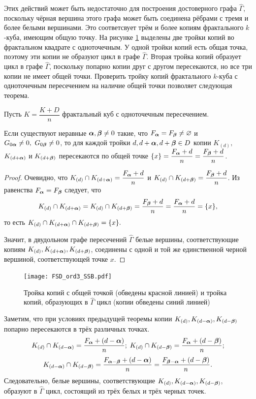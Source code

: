 Этих действий может быть недостаточно для построения достоверного графа $\hat\Gamma$, поскольку чёрная вершина этого графа может быть соединена рёбрами с тремя и более белыми вершинами.
Это соответсвует трём и более копиям фрактального $k$-куба, имеющим общую точку.
На рисунке \ref{fig:triple} выделены две тройки копий во фрактальном квадрате с одноточечным.
У одной тройки копий есть общая точка, поэтому эти копии не образуют цикл в графе $\hat\Gamma$.
Вторая тройка копий образует цикл в графе $\hat\Gamma$, поскольку попарно копии друг с другом пересекаются, но все три копии не имеет общей точки.
Проверить тройку копий фрактального $k$-куба с одноточечным пересечением на наличие общей точки позволяет следующая теорема.


\begin{theorem}\label{thm:triple}
Пусть $K=\dfrac{K+D}{n}$ фрактальный куб с одноточечным пересечением. 

Если существуют неравные ${\bm{\alpha}},{\bm{\beta}}\neq0$ такие, что $F_{\bm{\alpha}}=F_{\bm{\beta}}\neq\varnothing$ и $G_{0{\bm{\alpha}}}\neq0,\ G_{0{\bm{\beta}}}\neq0$,  то для каждой тройки $d, d+{\bm{\alpha}}, d+{\bm{\beta}}\in D$ копии $K_{(d)},$ $K_{(d+{\bm{\alpha}})}$ и $K_{(d+{\bm{\beta}})}$ пересекаются по общей точке $\{x\}=\dfrac{F_{\bm{\alpha}}+d}{n}=\dfrac{F_{\bm{\beta}}+d}{n}$.
\end{theorem}

\begin{proof}
Очевидно, что $K_{(d)}\cap K_{(d+{\bm{\alpha}})}=\dfrac{F_{\bm{\alpha}}+d}{n}$ и $K_{(d)}\cap K_{(d+{\bm{\beta}})}=\dfrac{F_{\bm{\beta}}+d}{n}$.
Из равенства $F_{\bm{\alpha}}=F_{\bm{\beta}}$ следует, что
$$K_{(d)}\cap K_{(d+{\bm{\alpha}})}=K_{(d)}\cap K_{(d+{\bm{\beta}})}=\dfrac{F_{\bm{\beta}}+d}{n}=\dfrac{F_{\bm{\alpha}}+d}{n}=\{x\},$$
то есть $K_{(d)}\cap K_{(d+{\bm{\alpha}})}\cap K_{(d+{\bm{\beta}})}=\{x\}.$

Значит, в двудольном графе пересечений $\hat\Gamma$ белые вершины, соответствующие копиям $K_{(d)}, K_{(d+{\bm{\alpha}})}, K_{(d+{\bm{\beta}})}$, соединены с одной и той же единственной черной вершиной, соответствующей точке $x$.
\end{proof}

\begin{figure}[H]
    \centering
    \texttt{[image: FSD\_ord3\_SSB.pdf]}
    \caption{Тройка копий с общей точкой (обведены красной линией) и тройка копий, образующих в $\hat\Gamma$ цикл (копии обведены синий линией)}
    \label{fig:triple}
\end{figure}

Заметим, что при условиях предыдущей теоремы копии $K_{(d)}, K_{(d-{\bm{\alpha}})}, K_{(d-{\bm{\beta}})}$ попарно пересекаются в трёх различных точках.
$$  K_{(d)}\cap K_{(d-{\bm{\alpha}})}=\dfrac{F_{\bm{\alpha}}+(d-{\bm{\alpha}})}{n};\;
    K_{(d)}\cap K_{(d-{\bm{\beta}})}=\dfrac{F_{\bm{\alpha}}+(d-{\bm{\beta}})}{n};$$
$$  K_{(d-{\bm{\alpha}})}\cap K_{(d-{\bm{\beta}})}=\dfrac{F_{{\bm{\alpha}}-{\bm{\beta}}}+(d-{\bm{\alpha}})}{n}=\dfrac{F_{{\bm{\beta}}-{\bm{\alpha}}}+(d-{\bm{\beta}})}{n}.$$
Следовательно, белые вершины, соответствующие $K_{(d)}, K_{(d-{\bm{\alpha}})}, K_{(d-{\bm{\beta}})}$, образуют в $\hat\Gamma$ цикл, состоящий из трёх белых и трёх черных точек.

